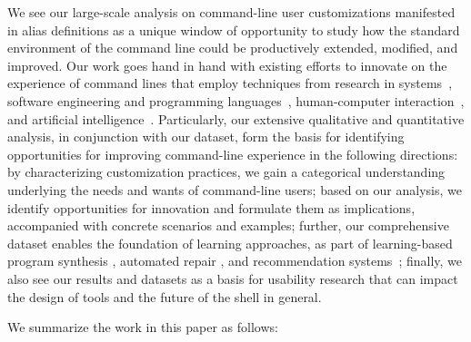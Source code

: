 \documentclass[smallextended,natbib]{svjour3}
\begin{document}
We see our large-scale analysis on command-line user customizations manifested in alias definitions as a unique window of opportunity to study how the standard environment of the command line could be productively extended, modified, and improved. 
Our work goes hand in hand with existing efforts to innovate on the experience of command lines that employ techniques from research in systems~\citep{posh, odfg}, software engineering and programming languages~\citep{pash, kumquat, dantoni:17}, human-computer interaction~\citep{bespoke:19, gandhi2020}, and artificial intelligence~\citep{clai, nl2bash, findcmd}.
Particularly, our extensive qualitative and quantitative analysis, in conjunction with our dataset, form the basis for identifying opportunities for improving command-line experience in the following directions: by characterizing customization practices, we gain a categorical understanding underlying the needs and wants of command-line users; based on our analysis, we identify opportunities for innovation and formulate them as implications, accompanied with concrete scenarios and examples; %
further, our comprehensive dataset enables the foundation of learning approaches, as part of learning-based program synthesis \citep{bruch:09,raychev2014completion}, automated repair \citep{monperrus:18}, and recommendation systems~\citep{mens2014source};
finally, we also see our results and datasets as a basis for usability research that can impact the design of tools and the future of the shell in general.


\smallskip
\noindent We summarize the work in this paper as follows:
\end{document}
